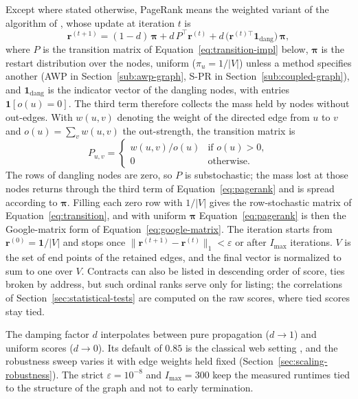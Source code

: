 Except where stated otherwise, PageRank means the weighted variant of the algorithm of \textcite{page1999pagerank}, whose update at iteration $t$ is
\begin{equation}
\label{eq:pagerank}
\mathbf{r}^{(t+1)}
=
(1-d)\,\boldsymbol{\pi}
+
d\,P^{\top}\mathbf{r}^{(t)}
+
d\,\bigl(\mathbf{r}^{(t)\top}\mathbf{1}_{\mathrm{dang}}\bigr)\,\boldsymbol{\pi},
\end{equation}
where $P$ is the transition matrix of Equation~\eqref{eq:transition-impl} below, $\boldsymbol{\pi}$ is the restart distribution over the nodes, uniform ($\pi_u=1/|V|$) unless a method specifies another (AWP in Section~\ref{sub:awp-graph}, S-PR in Section~\ref{sub:coupled-graph}), and $\mathbf{1}_{\mathrm{dang}}$ is the indicator vector of the dangling nodes, with entries $\mathbf{1}[o(u)=0]$. The third term therefore collects the mass held by nodes without out-edges. With $w(u,v)$ denoting the weight of the directed edge from $u$ to $v$ and $o(u)=\sum_v w(u,v)$ the out-strength, the transition matrix is
\begin{equation}
\label{eq:transition-impl}
P_{u,v}
=
\begin{cases}
w(u,v)/o(u) & \text{if }o(u)>0,\\
0 & \text{otherwise.}
\end{cases}
\end{equation}
The rows of dangling nodes are zero, so $P$ is substochastic; the mass lost at those nodes returns through the third term of Equation~\eqref{eq:pagerank} and is spread according to $\boldsymbol{\pi}$. Filling each zero row with $1/|V|$ gives the row-stochastic matrix of Equation~\eqref{eq:transition}, and with uniform $\boldsymbol{\pi}$ Equation~\eqref{eq:pagerank} is then the Google-matrix form of Equation~\eqref{eq:google-matrix}. The iteration starts from $\mathbf{r}^{(0)}=\mathbf{1}/|V|$ and stops once $\|\mathbf{r}^{(t+1)}-\mathbf{r}^{(t)}\|_1 < \varepsilon$ or after $I_{\max}$ iterations. $V$ is the set of end points of the retained edges, and the final vector is normalized to sum to one over $V$. Contracts can also be listed in descending order of score, ties broken by address, but such ordinal ranks serve only for listing; the correlations of Section~\ref{sec:statistical-tests} are computed on the raw scores, where tied scores stay tied.

The damping factor $d$ interpolates between pure propagation ($d\to 1$) and uniform scores ($d\to 0$). Its default of $0.85$ is the classical web setting \parencite{page1999pagerank}, and the robustness sweep varies it with edge weights held fixed (Section~\ref{sec:scaling-robustness}). The strict $\varepsilon=10^{-8}$ and $I_{\max}=300$ keep the measured runtimes tied to the structure of the graph and not to early termination.

